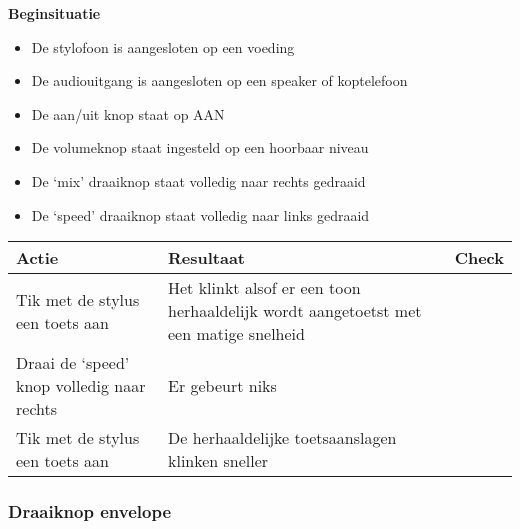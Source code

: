 \documentclass[12pt, a4paper, dutch]{article}
\newcommand{\cb}{\Square}
\newcommand{\stroom}{De stylofoon is aangesloten op een voeding}
\newcommand{\audio}{De audiouitgang is aangesloten op een speaker of koptelefoon}
\newcommand{\aan}{De aan/uit knop staat op AAN}
\newcommand{\vol}{De volumeknop staat ingesteld op een hoorbaar niveau}
\begin{document}
\begin{minipage}{\textwidth}
\textbf{Beginsituatie}
\begin{itemize}
	\item \stroom
	\item \audio
	\item \aan
	\item \vol
	\item De `mix' draaiknop staat volledig naar rechts gedraaid
	\item De `speed' draaiknop staat volledig naar links gedraaid
\end{itemize}

\medskip

\begin{tabularx}{\textwidth}{p{}p{}>{\raggedleft\arraybackslash}X}
\toprule
\textbf{Actie} & \textbf{Resultaat} & \textbf{Check}\\
\midrule
Tik met de stylus een toets aan &
Het klinkt alsof er een toon herhaaldelijk wordt aangetoetst met een matige snelheid &
\cb\\

Draai de `speed' knop volledig naar rechts &
Er gebeurt niks &
\cb\\

Tik met de stylus een toets aan &
De herhaaldelijke toetsaanslagen klinken sneller &
\cb\\
\bottomrule
\end{tabularx}
\end{minipage}

\subsubsection{Draaiknop envelope}
\end{document}
